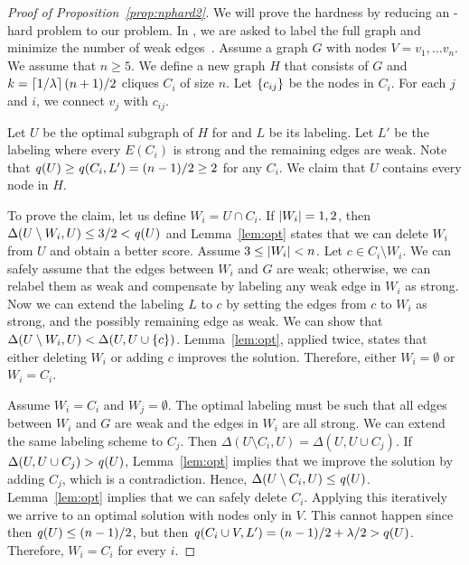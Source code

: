\begin{proof}[Proof of Proposition~\ref{prop:nphard2}]
We will prove the hardness by reducing an \np-hard problem \prbminSTC to our problem. In \prbminSTC, we are asked to label the full graph and minimize the number of weak edges~\citep{sintos2014using}.
Assume a graph $G$ with nodes $V = v_1, \ldots v_n$. We assume that $n \geq 5$.
We define a new graph $H$ that consists of $G$ and $k = \left\lceil1/\lambda\right\rceil(n + 1)/2$ cliques $C_i$ of size $n$. Let $\left\{c_{ij}\right\}$ be the nodes in $C_i$. For each $j$ and $i$, we connect $v_j$ with $c_{ij}$.

Let $U$ be the optimal subgraph of $H$ for \prbstrwk and $L$ be its labeling.
Let $L'$ be the labeling where every $E(C_i)$ is strong and the remaining edges are weak. Note that $\score{U} \geq \score{C_i, L'} = (n - 1)/2 \geq 2$ for any $C_i$. We claim that $U$ contains every node in $H$.


To prove the claim, let us define $W_i = U \cap C_i$. If ${\left|W_i\right|} = 1, 2$, then $\Delta(U \setminus W_i, U) \leq 3/2 < \score{U}$ and Lemma~\ref{lem:opt} states that we can delete $W_i$ from $U$ and obtain a better score. Assume $3 \leq {\left|W_i\right|} < n$. Let $c \in C_i \setminus W_i$. We can safely assume that the edges between $W_i$ and $G$ are weak; otherwise, we can relabel them as weak and compensate by labeling any weak edge in $W_i$ as strong. Now we can extend the labeling $L$ to $c$ by setting the edges from $c$ to $W_i$ as strong, and the possibly remaining edge as weak. We can show that $\Delta(U \setminus W_i, U) < \Delta(U,U \cup \left\{c\right\})$. Lemma~\ref{lem:opt}, applied twice, states that either deleting $W_i$ or adding $c$ improves the solution. Therefore, either $W_i = \emptyset$  or $W_i = C_i$.

Assume $W_i = C_i$ and $W_j = \emptyset$. The optimal labeling must be such that all edges between $W_i$ and $G$ are weak and the edges in $W_i$ are all strong. We can extend the same labeling scheme to $C_j$. Then $\Delta(U \setminus C_i, U) = \Delta(U, U \cup C_j)$. If $\Delta(U, U \cup C_j) > \score{U}$,  Lemma~\ref{lem:opt} implies that we improve the solution by adding $C_j$, which is a contradiction. Hence, $\Delta(U \setminus C_i, U) \leq \score{U}$. Lemma~\ref{lem:opt} implies that we can safely delete $C_i$. Applying this iteratively we arrive to an optimal solution with nodes only in $V$.
This cannot happen since then $\score{U} \leq (n - 1)/2$,
but then $\score{C_i \cup V, L'} = (n - 1)/2 + \lambda/2 > q(U)$. Therefore, $W_i = C_i$ for every $i$.


\end{proof}
